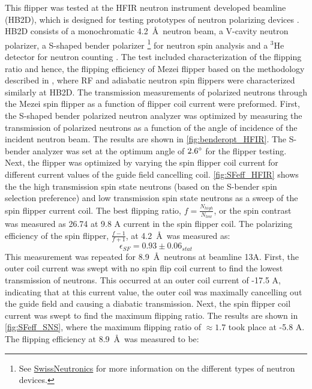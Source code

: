 This flipper was tested at the HFIR neutron instrument developed beamline (HB2D), which is designed for testing prototypes of neutron polarizing devices \cite{Crow2016}. HB2D consists of a monochromatic 4.2~\AA\ neutron beam, a V-cavity neutron polarizer, a S-shaped bender polarizer \footnote{See \href{https://www.swissneutronics.ch/}{SwissNeutronics} for more information on the different types of neutron devices.} for neutron spin analysis and a $^3$He detector for neutron counting \cite{Crow2016}. The test included characterization of the flipping ratio and hence, the flipping efficiency of Mezei flipper based on the methodology described in \cite{Li2020, Dadisman2020}, where RF and adiabatic neutron spin flippers were characterized similarly at HB2D. The transmission measurements of polarized neutrons through the Mezei spin flipper as a function of flipper coil current were preformed. First, the S-shaped bender polarized neutron analyzer was optimized by measuring the transmission of polarized neutrons as a function of the angle of incidence of the incident neutron beam. The results are shown in \cref{fig:benderopt_HFIR}. The S-bender analyzer was set at the optimum angle of $2.6\degree$ for the flipper testing. Next, the flipper was optimized by varying the spin flipper coil current for different current values of the guide field cancelling coil. \cref{fig:SFeff_HFIR} shows the the high transmission spin state neutrons (based on the S-bender spin selection preference) and low transmission spin state neutrons as a sweep of the spin flipper current coil. The best flipping ratio, $f=\frac{N_{high}}{N_{low}}$, or the spin contrast was measured as 26.74 at 9.8 A current in the spin flipper coil. The polarizing efficiency of the spin flipper, $\frac{f-1}{f+1}$, at 4.2~\AA\ was measured as:
\begin{equation}
    \epsilon_{SF} = 0.93 \pm 0.06_{stat}
\end{equation}
This measurement was repeated for 8.9~\AA\ neutrons at beamline 13A. First, the outer coil current was swept with no spin flip coil current to find the lowest transmission of neutrons. This occurred at an outer coil current of -17.5 A, indicating that at this current value, the outer coil was maximally cancelling out the guide field and causing a diabatic transmission. Next, the spin flipper coil current was swept to find the maximum flipping ratio. The results are shown in \cref{fig:SFeff_SNS}, where the maximum flipping ratio of $\approx1.7$ took place at -5.8 A. The flipping efficiency at 8.9~\AA\ was measured to be:
